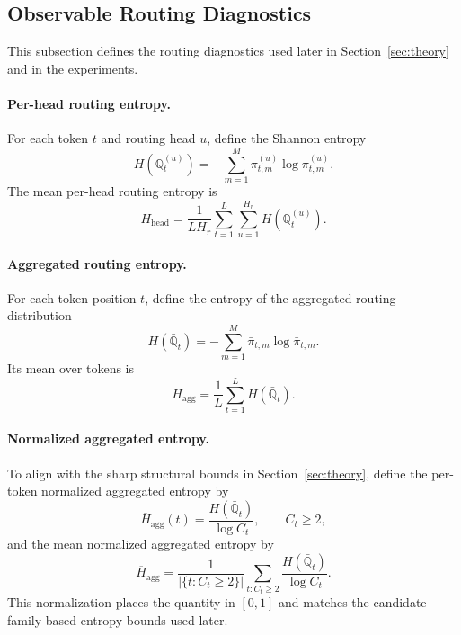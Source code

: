 \documentclass{article}
\theoremstyle{plain}
\theoremstyle{definition}
\theoremstyle{remark}
\begin{document}
\subsection{Observable Routing Diagnostics}
\label{sec:routing-diagnostics}

This subsection defines the routing diagnostics used later in Section~\ref{sec:theory} and in the experiments.

\paragraph{Per-head routing entropy.}
For each token $t$ and routing head $u$, define the Shannon entropy
\begin{equation}
\label{eq:per-head-entropy-single}
H(\mathbb Q_t^{(u)})
=
-\sum_{m=1}^M \pi_{t,m}^{(u)}\log \pi_{t,m}^{(u)}.
\end{equation}
The mean per-head routing entropy is
\begin{equation}
\label{eq:per-head-entropy-mean}
H_{\mathrm{head}}
=
\frac{1}{LH_r}
\sum_{t=1}^L\sum_{u=1}^{H_r}
H(\mathbb Q_t^{(u)}).
\end{equation}

\paragraph{Aggregated routing entropy.}
For each token position $t$, define the entropy of the aggregated routing distribution
\begin{equation}
\label{eq:aggregated-entropy-single}
H(\bar{\mathbb Q}_t)
=
-\sum_{m=1}^M \bar\pi_{t,m}\log \bar\pi_{t,m}.
\end{equation}
Its mean over tokens is
\begin{equation}
\label{eq:aggregated-entropy}
H_{\mathrm{agg}}
=
\frac{1}{L}\sum_{t=1}^L H(\bar{\mathbb Q}_t).
\end{equation}

\paragraph{Normalized aggregated entropy.}
To align with the sharp structural bounds in Section~\ref{sec:theory}, define the per-token normalized aggregated entropy by
\begin{equation}
\label{eq:normalized-agg-entropy-token}
\overline H_{\mathrm{agg}}(t)
=
\frac{H(\bar{\mathbb Q}_t)}{\log C_t},
\qquad C_t\ge 2,
\end{equation}
and the mean normalized aggregated entropy by
\begin{equation}
\label{eq:normalized-agg-entropy}
\overline H_{\mathrm{agg}}
=
\frac{1}{|\{t:C_t\ge 2\}|}
\sum_{t:C_t\ge 2}
\frac{H(\bar{\mathbb Q}_t)}{\log C_t}.
\end{equation}
This normalization places the quantity in $[0,1]$ and matches the candidate-family-based entropy bounds used later.
\end{document}
